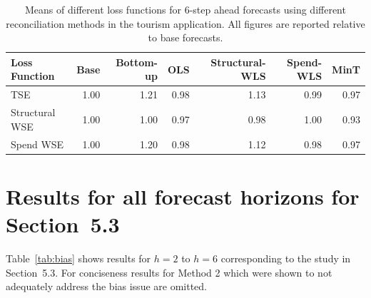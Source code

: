 \documentclass[12pt]{article}
\begin{document}
  \begin{table}[ht]
    \centering
	\begin{tabular}{lrrrrrr}
		\hline
		Loss Function & Base & Bottom-up & OLS & Structural-WLS & Spend-WLS & MinT \\
		\hline
		TSE & 1.00 & 1.21 & 0.98 & 1.13 & 0.99 & 0.97 \\
		Structural WSE & 1.00 & 1.00 & 0.97 & 0.98 & 1.00 & 0.93 \\
		Spend WSE & 1.00 & 1.20 & 0.98 & 1.12 & 0.98 & 0.97 \\
		\hline
	\end{tabular}
	\caption{Means of different loss functions for 6-step ahead forecasts using different reconciliation methods in the tourism application.  All figures are reported relative to base forecasts.}
	\label{tab:sec52h6}
  \end{table}

  \section{Results for all forecast horizons for Section~5.3}

  Table~\ref{tab:bias} shows results for $h=2$ to $h=6$ corresponding to the study in Section~5.3.  For conciseness results for Method 2 which were shown to not adequately address the bias issue are omitted.
\end{document}

